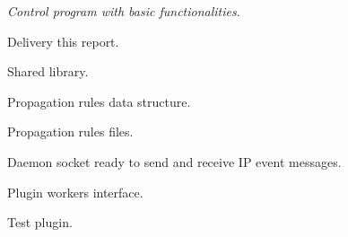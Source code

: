 \documentclass[a4paper,11pt]{article}
\begin{document}
\begin{multicols}{2}
\begin{list}{-}{March 9th, 2012}
  \item \emph{Control program with basic functionalities}.
  \item Delivery this report.
\end{list}
\begin{list}{-}{March 16th, 2012}
  \item Shared library.
\end{list}
\begin{list}{-}{March 30th, 2012}
  \item Propagation rules data structure.
  \item Propagation rules files.
\end{list}
\begin{list}{-}{April 13th, 2012}
  \item Daemon socket ready to send and receive IP event messages.
  \item Plugin workers interface.
\end{list}
\begin{list}{-}{April 27th, 2012}
  \item Test plugin.

\end{list}
\end{multicols}
\end{document}
